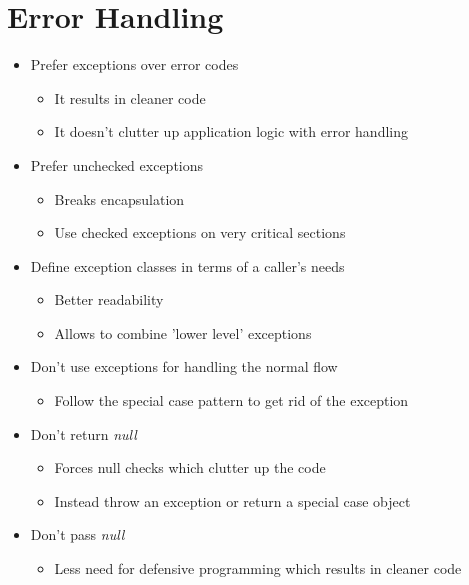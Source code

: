 
\section{Error Handling}
\begin{itemize}
    \item Prefer exceptions over error codes
    \begin{itemize}
        \item It results in cleaner code
        \item It doesn't clutter up application logic with error handling
    \end{itemize}
    \item Prefer unchecked exceptions
    \begin{itemize}
        \item Breaks encapsulation
        \item Use checked exceptions on very critical sections
    \end{itemize}
    \item Define exception classes in terms of a caller's needs
    \begin{itemize}
        \item Better readability
        \item Allows to combine 'lower level' exceptions
    \end{itemize}
    \item Don't use exceptions for handling the normal flow
    \begin{itemize}
        \item Follow the special case pattern to get rid of the exception
    \end{itemize}
    \item Don't return \textit{null}
    \begin{itemize}
        \item Forces null checks which clutter up the code
        \item Instead throw an exception or return a special case object
    \end{itemize}
    \item Don't pass \textit{null}
    \begin{itemize}
        \item Less need for defensive programming which results in cleaner code
    \end{itemize}
\end{itemize}